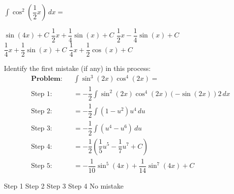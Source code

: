\begin{questions}
    \question $\int \cos^2 \left(\dfrac{1}{2}x\right) \, dx = $ \\

    \begin{oneparchoices}
        \choice $\sin (4x) + C$
        \choice $\dfrac{1}{2}x + \dfrac{1}{4}\sin (x) + C$
        \choice $\dfrac{1}{2}x - \dfrac{1}{4}\sin (x) + C$ \\[11pt]
        \makebox[0.18\textwidth]\choice $\dfrac{1}{4}x + \dfrac{1}{2}\sin (x) + C$
        \makebox[0.22\textwidth] \choice $\dfrac{1}{4}x + \dfrac{1}{2}\cos (x) + C$
    \end{oneparchoices} \par \horizontalline

    \question Identify the first mistake (if any) in this process: \begin{align*}
        & \textbf{Problem:} && \int \sin^3 (2x)\cos^4 (2x) = \\[11pt]
        & \text{Step 1:} && = -\dfrac{1}{2}\int \sin^2 (2x)\cos^4 (2x)(-\sin (2x))2 \, dx \\[5.5pt]
        & \text{Step 2:} && = -\dfrac{1}{2}\int \left(1 - u^2\right)u^4 \, du \\[5.5pt]
        & \text{Step 3:} && = -\dfrac{1}{2}\int \left(u^4 - u^6\right) \, du \\[5.5pt]
        & \text{Step 4:} && = -\dfrac{1}{2}\left(\dfrac{1}{5}u^5 - \dfrac{1}{7}u^7 + C\right) \\[5.5pt]
        & \text{Step 5:} && = -\dfrac{1}{10}\sin^5 (4x) + \dfrac{1}{14}\sin^7 (4x) + C
    \end{align*}

    \begin{oneparchoices}
        \choice Step 1
        \choice Step 2
        \choice Step 3
        \choice Step 4
        \choice No mistake
    \end{oneparchoices} \par \horizontalline
\end{questions}